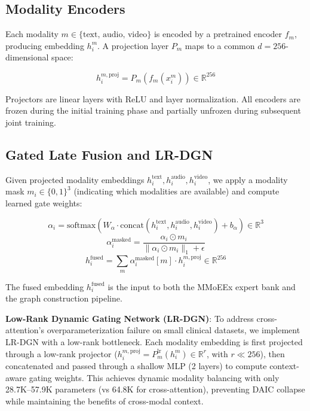 \documentclass[12pt,oneside]{book}
\begin{document}
\subsection{Modality Encoders}

Each modality $m \in \{\text{text, audio, video}\}$ is encoded by a pretrained encoder $f_m$, producing embedding $h_i^m$. A projection layer $P_m$ maps to a common $d=256$-dimensional space:

\begin{equation}
    h_i^{m,\text{proj}} = P_m(f_m(x_i^m)) \in \mathbb{R}^{256}
\end{equation}

Projectors are linear layers with ReLU and layer normalization. All encoders are frozen during the initial training phase and partially unfrozen during subsequent joint training.

\subsection{Gated Late Fusion and LR-DGN}

Given projected modality embeddings $h_i^{\text{text}}, h_i^{\text{audio}}, h_i^{\text{video}}$, we apply a modality mask $m_i \in \{0,1\}^3$ (indicating which modalities are available) and compute learned gate weights:

\begin{equation}
    \alpha_i = \text{softmax}(W_\alpha \cdot \text{concat}(h_i^{\text{text}}, h_i^{\text{audio}}, h_i^{\text{video}}) + b_\alpha) \in \mathbb{R}^3
\end{equation}
\begin{equation}
    \alpha_i^{\text{masked}} = \frac{\alpha_i \odot m_i}{\|\alpha_i \odot m_i\|_1 + \epsilon}
\end{equation}
\begin{equation}
    h_i^{\text{fused}} = \sum_{m} \alpha_i^{\text{masked}}[m] \cdot h_i^{m,\text{proj}} \in \mathbb{R}^{256}
\end{equation}

The fused embedding $h_i^{\text{fused}}$ is the input to both the MMoEEx expert bank and the graph construction pipeline.

\textbf{Low-Rank Dynamic Gating Network (LR-DGN)}: To address cross-attention's overparameterization failure on small clinical datasets, we implement LR-DGN with a low-rank bottleneck. Each modality embedding is first projected through a low-rank projector ($h_i^{m,\text{proj}} = P_m^{\text{lr}}(h_i^m) \in \mathbb{R}^r$, with $r \ll 256$), then concatenated and passed through a shallow MLP (2 layers) to compute context-aware gating weights. This achieves dynamic modality balancing with only 28.7K--57.9K parameters (vs 64.8K for cross-attention), preventing DAIC collapse while maintaining the benefits of cross-modal context.
\end{document}
